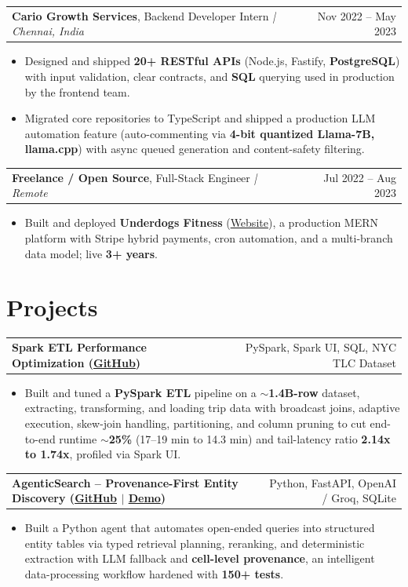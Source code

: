 \documentclass[letterpaper,11pt]{article}
\makeatletter
\newcommand{\expItem}[4]{%
  \vspace{3pt}
  \begin{tabular*}{\textwidth}{@{}l@{\extracolsep{\fill}}r@{}}
    \textbf{#1}, #2 \textit{| #3} & #4 \\
  \end{tabular*}\par\vspace{-2pt}
}
\newcommand{\projItem}[2]{%
  \vspace{6pt}
  \begin{tabular*}{\textwidth}{@{}l@{\extracolsep{\fill}}r@{}}
    \textbf{#1} & #2 \\
  \end{tabular*}\par\vspace{-2pt}
}
\makeatother
\begin{document}
\expItem{Cario Growth Services}{Backend Developer Intern}{Chennai, India}{Nov 2022 -- May 2023}
\begin{itemize}
  \item Designed and shipped \textbf{20+ RESTful APIs} (Node.js, Fastify, \textbf{PostgreSQL}) with input validation, clear contracts, and \textbf{SQL} querying used in production by the frontend team.
  \item Migrated core repositories to TypeScript and shipped a production LLM automation feature (auto-commenting via \textbf{4-bit quantized Llama-7B, llama.cpp}) with async queued generation and content-safety filtering.
\end{itemize}

\expItem{Freelance / Open Source}{Full-Stack Engineer}{Remote}{Jul 2022 -- Aug 2023}
\begin{itemize}
  \item Built and deployed \textbf{Underdogs Fitness} (\href{https://www.underdogsfitness.in/}{Website}), a production MERN platform with Stripe hybrid payments, cron automation, and a multi-branch data model; live \textbf{3+ years}.
\end{itemize}

\section{Projects}

\projItem{Spark ETL Performance Optimization {\normalfont\small(\href{https://github.com/Deva-1903/Spark-ETL-Optimization}{GitHub})}}{PySpark, Spark UI, SQL, NYC TLC Dataset}
\begin{itemize}
  \item Built and tuned a \textbf{PySpark ETL} pipeline on a \textbf{$\sim$1.4B-row} dataset, extracting, transforming, and loading trip data with broadcast joins, adaptive execution, skew-join handling, partitioning, and column pruning to cut end-to-end runtime \textbf{$\sim$25\%} (17--19 min to 14.3 min) and tail-latency ratio \textbf{2.14x to 1.74x}, profiled via Spark UI.
\end{itemize}

\projItem{AgenticSearch -- Provenance-First Entity Discovery {\normalfont\small(\href{https://github.com/Deva-1903/ciir_agentic_search}{GitHub} $\vert$ \href{https://agentic-search-negglszkwa-uc.a.run.app}{Demo})}}{Python, FastAPI, OpenAI / Groq, SQLite}
\begin{itemize}
  \item Built a Python agent that automates open-ended queries into structured entity tables via typed retrieval planning, reranking, and deterministic extraction with LLM fallback and \textbf{cell-level provenance}, an intelligent data-processing workflow hardened with \textbf{150+ tests}.
\end{itemize}
\end{document}
